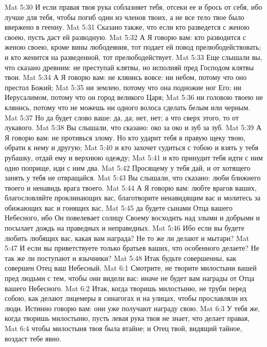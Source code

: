 \vs Mat 5:30 И если правая твоя рука соблазняет тебя, отсеки ее и брось от себя, ибо лучше для тебя, чтобы погиб один из членов твоих, а не все тело твое было ввержено в геенну.
\rsbpar\vs Mat 5:31 Сказано также, что если кто разведется с женою своею, пусть даст ей разводную.
\vs Mat 5:32 А Я говорю вам: кто разводится с женою своею, кроме вины любодеяния, тот подает ей повод прелюбодействовать; и кто женится на разведенной, тот прелюбодействует.
\rsbpar\vs Mat 5:33 Еще слышали вы, что сказано древним: не преступай клятвы, но исполняй пред Господом клятвы твои.
\vs Mat 5:34 А Я говорю вам: не клянись вовсе: ни небом, потому что оно престол Божий;
\vs Mat 5:35 ни землею, потому что она подножие ног Его; ни Иерусалимом, потому что он город великого Царя;
\vs Mat 5:36 ни головою твоею не клянись, потому что не можешь ни одного волоса сделать белым или черным.
\vs Mat 5:37 Но да будет слово ваше: да, да; нет, нет; а что сверх этого, то от лукавого.
\rsbpar\vs Mat 5:38 Вы слышали, что сказано: око за око и зуб за зуб.
\vs Mat 5:39 А Я говорю вам: не противься злому. Но кто ударит тебя в правую щеку твою, обрати к нему и другую;
\vs Mat 5:40 и кто захочет судиться с тобою и взять у тебя рубашку, отдай ему и верхнюю одежду;
\vs Mat 5:41 и кто принудит тебя идти с ним одно поприще, иди с ним два.
\vs Mat 5:42 Просящему у тебя дай, и от хотящего занять у тебя не отвращайся.
\rsbpar\vs Mat 5:43 Вы слышали, что сказано: люби ближнего твоего и ненавидь врага твоего.
\vs Mat 5:44 А Я говорю вам: любте врагов ваших, благословляйте проклинающих вас, благотворите ненавидящим вас и молитесь за обижающих вас и гонящих вас,
\vs Mat 5:45 да будете сынами Отца вашего Небесного, ибо Он повелевает солнцу Своему восходить над злыми и добрыми и посылает дождь на праведных и неправедных.
\vs Mat 5:46 Ибо если вы будете любить любящих вас, какая вам награда? Не то же ли делают и мытари?
\vs Mat 5:47 И если вы приветствуете только братьев ваших, что особенного делаете? Не так же ли поступают и язычники?
\rsbpar\vs Mat 5:48 Итак будьте совершенны, как совершен Отец ваш Небесный.
\vs Mat 6:1 Смотрите, не творите милостыни вашей пред людьми с тем, чтобы они видели вас: иначе не будет вам награды от Отца вашего Небесного.
\vs Mat 6:2 Итак, когда творишь милостыню, не труби перед собою, как делают лицемеры в синагогах и на улицах, чтобы прославляли их люди. Истинно говорю вам: они уже получают награду свою.
\vs Mat 6:3 У тебя же, когда творишь милостыню, пусть левая рука твоя не знает, что делает правая,
\vs Mat 6:4 чтобы милостыня твоя была втайне; и Отец твой, видящий тайное, воздаст тебе явно.
